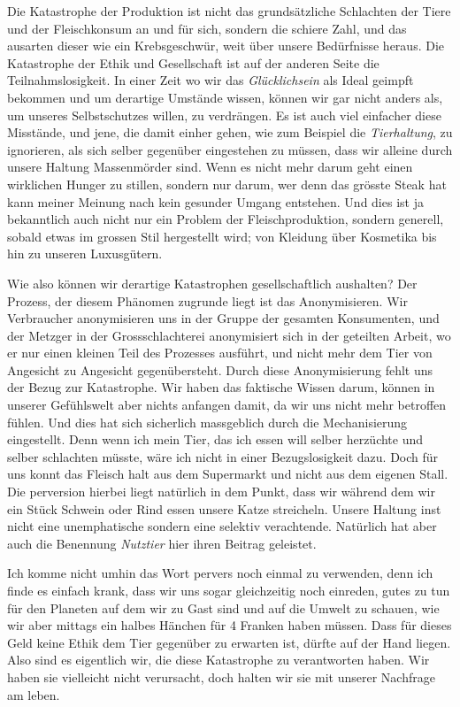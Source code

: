 \documentclass[a4paper,ngerman,11pt]{scrartcl}
\begin{document}
Die Katastrophe der Produktion ist nicht das grundsätzliche Schlachten der Tiere
und der Fleischkonsum an und für sich, sondern die schiere Zahl, und das
ausarten dieser wie ein Krebsgeschwür, weit über unsere Bedürfnisse heraus. Die
Katastrophe der Ethik und Gesellschaft ist auf der anderen Seite die
Teilnahmslosigkeit. In einer Zeit wo wir das \emph{Glücklichsein} als Ideal geimpft
bekommen und um derartige Umstände wissen, können wir gar nicht anders als, um
unseres Selbstschutzes willen, zu verdrängen. Es ist auch viel einfacher diese
Misstände, und jene, die damit einher gehen, wie zum Beispiel die \emph{Tierhaltung},
zu ignorieren, als sich selber gegenüber eingestehen zu müssen, dass wir alleine
durch unsere Haltung Massenmörder sind. Wenn es nicht mehr darum geht einen
wirklichen Hunger zu stillen, sondern nur darum, wer denn das grösste Steak hat
kann meiner Meinung nach kein gesunder Umgang entstehen. Und dies ist ja
bekanntlich auch nicht nur ein Problem der Fleischproduktion, sondern generell,
sobald etwas im grossen Stil hergestellt wird; von Kleidung über Kosmetika bis
hin zu unseren Luxusgütern.

Wie also können wir derartige Katastrophen gesellschaftlich aushalten? Der
Prozess, der diesem Phänomen zugrunde liegt ist das Anonymisieren. Wir
Verbraucher anonymisieren uns in der Gruppe der gesamten Konsumenten, und der
Metzger in der Grossschlachterei anonymisiert sich in der geteilten Arbeit, wo
er nur einen kleinen Teil des Prozesses ausführt, und nicht mehr dem Tier von
Angesicht zu Angesicht gegenübersteht. Durch diese Anonymisierung fehlt uns der
Bezug zur Katastrophe. Wir haben das faktische Wissen darum, können in unserer
Gefühlswelt aber nichts anfangen damit, da wir uns nicht mehr betroffen
fühlen. Und dies hat sich sicherlich massgeblich durch die Mechanisierung
eingestellt. Denn wenn ich mein Tier, das ich essen will selber herzüchte und
selber schlachten müsste, wäre ich nicht in einer Bezugslosigkeit dazu. Doch für
uns konnt das Fleisch halt aus dem Supermarkt und nicht aus dem eigenen
Stall. Die perversion hierbei liegt natürlich in dem Punkt, dass wir während dem
wir ein Stück Schwein oder Rind essen unsere Katze streicheln. Unsere Haltung
inst nicht eine unemphatische sondern eine selektiv verachtende. Natürlich hat
aber auch die Benennung \emph{Nutztier} hier ihren Beitrag geleistet.

Ich komme nicht umhin das Wort pervers noch einmal zu verwenden, denn ich finde
es einfach krank, dass wir uns sogar gleichzeitig noch einreden, gutes zu tun
für den Planeten auf dem wir zu Gast sind und auf die Umwelt zu schauen, wie wir
aber mittags ein halbes Hänchen für 4 Franken haben müssen. Dass für dieses Geld
keine Ethik dem Tier gegenüber zu erwarten ist, dürfte auf der Hand liegen. Also
sind es eigentlich wir, die diese Katastrophe zu verantworten haben. Wir haben
sie vielleicht nicht verursacht, doch halten wir sie mit unserer Nachfrage am
leben.
\end{document}
